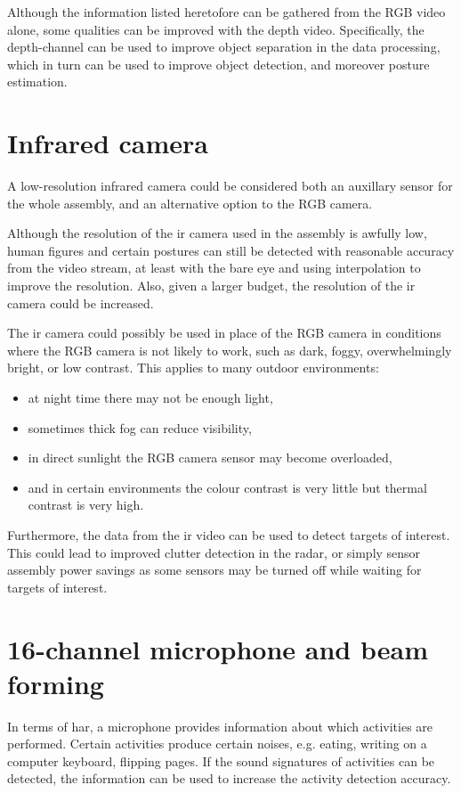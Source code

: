 Although the information listed heretofore can be gathered
from the RGB video alone,
some qualities can be improved with the depth video.
Specifically, the depth-channel can be used to improve object separation
in the data processing,
which in turn can be used to improve object detection,
and moreover posture estimation.

\section{Infrared camera}
A low-resolution infrared camera could be considered both
an auxillary sensor for the whole assembly,
and an alternative option to the RGB camera.

Although the resolution of the \gls{ir} camera used in the assembly
is awfully low,
human figures and certain postures can still be detected with reasonable accuracy
from the video stream, at least with the bare eye and using interpolation
to improve the resolution.
Also, given a larger budget, the resolution of the \gls{ir} camera could be increased.

The \gls{ir} camera could possibly be used in place of the RGB camera
in conditions where the RGB camera is not likely to work,
such as dark, foggy, overwhelmingly bright, or low contrast.
This applies to many outdoor environments:
\begin{itemize}
    \item at night time there may not be enough light,
    \item sometimes thick fog can reduce visibility,
    \item in direct sunlight the RGB camera sensor may become overloaded,
    \item and in certain environments the colour contrast is very little but thermal contrast is very high.
\end{itemize}

Furthermore, the data from the \gls{ir} video 
can be used to detect targets of interest.
This could lead to improved clutter detection in the radar,
or simply sensor assembly power savings as some sensors may be turned off
while waiting for targets of interest.


\section{16-channel microphone and beam forming}
In terms of \gls{har},
a microphone provides information about which activities are performed.
Certain activities produce certain noises, 
e.g. eating, writing on a computer keyboard, flipping pages.
If the sound signatures of activities can be detected,
the information can be used to increase the activity detection accuracy.

